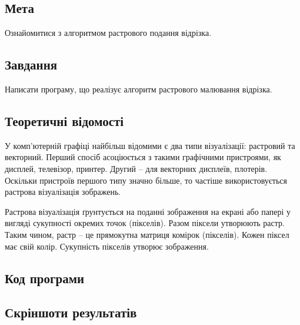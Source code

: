 \documentclass[a4paper,14pt]{extarticle}
\begin{document}


\newpage

\subsection*{Мета}
Ознайомитися з алгоритмом растрового подання відрізка.

\subsection*{Завдання} 
Написати програму, що реалізує алгоритм растрового малювання
відрізка.

\subsection*{Теоретичні відомості} 

У комп’ютерній графіці найбільш відомими є два типи візуалізації:
растровий та векторний. Перший спосіб асоціюється з такими графічними
пристроями, як дисплей, телевізор, принтер. Другий – для векторних
дисплеїв, плотерів. Оскільки пристроїв першого типу значно більше, то
частіше використовується растрова візуалізація зображень.

Растрова візуалізація ґрунтується на поданні зображення на екрані або
папері у вигляді сукупності окремих точок (пікселів). Разом піксели
утворюють растр. Таким чином, растр – це прямокутна матриця комірок
(пікселів). Кожен піксел має свій колір. Сукупність пікселів утворює
зображення.

\subsection*{Код програми}



\subsection*{Скріншоти результатів}
\end{document}
